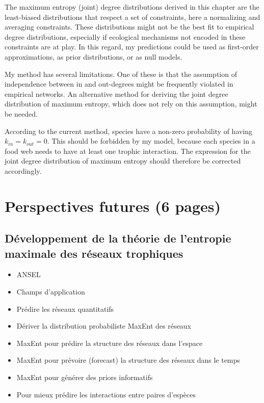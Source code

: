 The maximum entropy (joint) degree distributions derived in this chapter are the
least-biased distributions that respect a set of constraints, here a normalizing
and averaging constraints. These distributions might not be the best fit to
empirical degree distributions, especially if ecological mechanisms not encoded
in these constraints are at play. In this regard, my predictions could be used
as first-order approximations, as prior distributions, or as null models.

My method has several limitations. One of these is that the assumption of
independence between in and out-degrees might be frequently violated in
empirical networks. An alternative method for deriving the joint degree
distribution of maximum entropy, which does not rely on this assumption, might
be needed. 

According to the current
method, species have a non-zero probability of having $k_{in} = k_{out} = 0$.
This should be forbidden by my model, because each species in a food web needs
to have at least one trophic interaction. The expression for the joint degree
distribution of maximum entropy should therefore be corrected accordingly.

\section{Perspectives futures (6 pages)}

\subsection{Développement de la théorie de l'entropie maximale des réseaux trophiques} 

\begin{itemize}
    \item ANSEL 
    \item Champs d'application 
    \item Prédire les réseaux quantitatifs
    \item Dériver la distribution probabiliste MaxEnt des réseaux
    \item MaxEnt pour prédire la structure des réseaux dans l'espace
    \item MaxEnt pour prévoire (forecast) la structure des réseaux dans le temps
    \item MaxEnt pour générer des priors informatifs 
    \item Pour mieux prédire les interactions entre paires d'espèces
\end{itemize}

